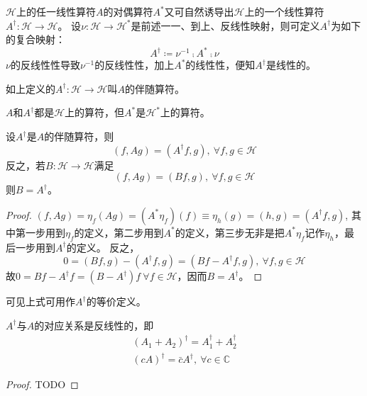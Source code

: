 $\mathscr{H}$上的任一线性算符$A$的对偶算符$A^*$又可自然诱导出$\mathscr{H}$上的一个线性算符$A^\dagger \colon \mathscr{H} \to \mathscr{H}$。
设$\nu \colon \mathscr{H} \to \mathscr{H}^*$是前述一一、到上、反线性映射，则可定义$A^\dagger$为如下的复合映射：
$$A^\dagger \coloneq \nu^{-1} \comp A^* \comp \nu$$
$\nu$的反线性性导致$\nu^{-1}$的反线性性，加上$A^*$的线性性，便知$A^\dagger$是线性的。

\begin{definition}
    如上定义的$A^\dagger \colon \mathscr{H} \to \mathscr{H}$叫$A$的伴随算符。
\end{definition}

\begin{note}
    $A$和$A^\dagger$都是$\mathscr{H}$上的算符，但$A^*$是$\mathscr{H}^*$上的算符。
\end{note}

\begin{theorem}
    设$A^\dagger$是$A$的伴随算符，则
    $$(f, Ag) = (A^\dagger f, g), ~ \forall f, g \in \mathscr{H}$$
    反之，若$B \colon \mathscr{H} \to \mathscr{H}$满足
    $$(f, Ag) = (Bf, g), ~ \forall f, g \in \mathscr{H}$$
    则$B = A^\dagger$。
\end{theorem}

\begin{proof}
    $(f, Ag) = \eta_f(Ag) = (A^*\eta_f)(f) \equiv \eta_h(g) = (h, g) = (A^\dagger f, g)$,
    其中第一步用到$\eta_f$的定义，第二步用到$A^*$的定义，第三步无非是把$A^*\eta_f$记作$\eta_h$，最后一步用到$A^\dagger$的定义。
    反之，
    $$0 = (Bf, g) - (A^\dagger f, g) = (Bf - A^\dagger f, g), ~ \forall f, g \in \mathscr{H}$$
    故$0 = Bf - A^\dagger f = (B - A^\dagger)f ~ \forall f \in \mathscr{H}$，因而$B = A^\dagger$。
\end{proof}

\begin{note}
    可见上式可用作$A^\dagger$的等价定义。
\end{note}

\begin{theorem}
    $A^\dagger$与$A$的对应关系是反线性的，即
    \[\begin{split}
        (A_1 + A_2)^\dagger = A_1^\dagger + A_2^\dagger \\
        (cA)^\dagger = \bar{c}A^\dagger, ~ \forall c \in \mathbb{C}
    \end{split}\]
\end{theorem}

\begin{proof}
    TODO
\end{proof}

